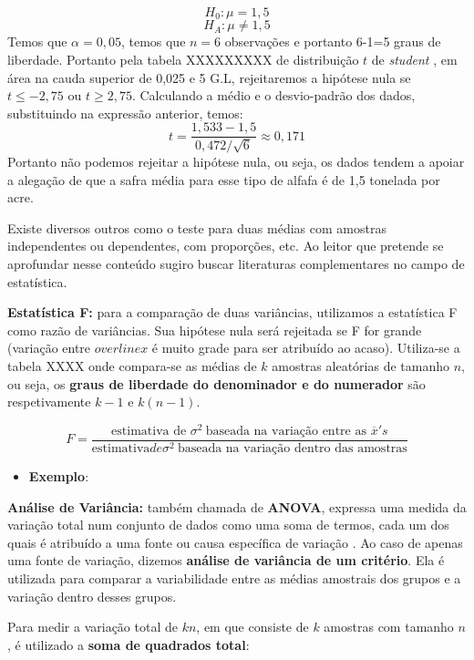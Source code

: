 \documentclass[
  openany]{book}
\providecommand{\tightlist}{%
  \setlength{\itemsep}{0pt}\setlength{\parskip}{0pt}}
\begin{document}
\[H_0: \mu=1,5\]
\[H_A: \mu\neq1,5\]
Temos que \(\alpha=0,05\), temos que \(n=6\) observações e portanto 6-1=5 graus de liberdade. Portanto pela tabela XXXXXXXXX de distribuição \(t\) de \emph{student} , em área na cauda superior de 0,025 e 5 G.L, rejeitaremos a hipótese nula se \(t\leq -2,75\) ou \(t\geq 2,75\). Calculando a médio e o desvio-padrão dos dados, substituindo na expressão anterior, temos:
\[t=\frac{1,533-1,5}{0,472/\sqrt{6}}\approx 0,171\]
Portanto não podemos rejeitar a hipótese nula, ou seja, os dados tendem a apoiar a alegação de que a safra média para esse tipo de alfafa é de 1,5 tonelada por acre.

Existe diversos outros como o teste para duas médias com amostras independentes ou dependentes, com proporções, etc. Ao leitor que pretende se aprofundar nesse conteúdo sugiro buscar literaturas complementares no campo de estatística.

\textbf{Estatística F:} para a comparação de duas variâncias, utilizamos a estatística F como razão de variâncias. Sua hipótese nula será rejeitada se F for grande (variação entre \(overline{x}\) é muito grade para ser atribuído ao acaso). Utiliza-se a tabela XXXX onde compara-se as médias de \(k\) amostras aleatórias de tamanho \(n\), ou seja, os \textbf{graus de liberdade do denominador e do numerador} são respetivamente \(k-1\) e \(k(n-1)\).

\begin{equation} 
F=\frac{\mbox{estimativa de }\sigma^2 \ \mbox{baseada na variação entre as }\overline{x}'s}{\mbox{estimativa} de \sigma^2 \ \mbox{baseada na variação dentro das amostras}}
  \label{eq:testef}
\end{equation}

\begin{itemize}
\tightlist
\item
  \textbf{Exemplo}:
\end{itemize}

\textbf{Análise de Variância:} também chamada de \textbf{ANOVA}, expressa uma medida da variação total num conjunto de dados como uma soma de termos, cada um dos quais é atribuído a uma fonte ou causa específica de variação \citep{freund2009estatistica}. Ao caso de apenas uma fonte de variação, dizemos \textbf{análise de variância de um critério}. Ela é utilizada para comparar a variabilidade entre as médias amostrais dos grupos e a variação dentro desses grupos.

Para medir a variação total de \(kn\), em que consiste de \(k\) amostras com tamanho \(n\), é utilizado a \textbf{soma de quadrados total}:
\end{document}
